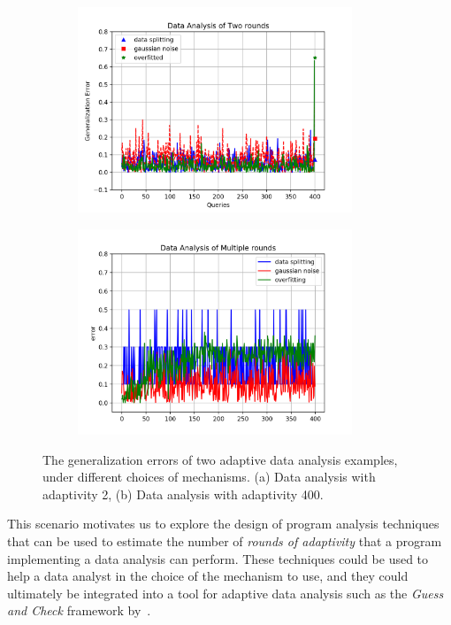 {\small
\begin{figure}
\centering
\begin{subfigure}{.48\textwidth}
\begin{centering}
\includegraphics[width=0.9\textwidth]{figures/tworound.png}
\caption{}
\end{centering}
\end{subfigure}
\quad
\begin{subfigure}{.48\textwidth}
\begin{centering}
\includegraphics[width=0.9\textwidth]{figures/multipleround.png}
\caption{}
\end{centering}
\end{subfigure}
\vspace{-0.4cm}
 \caption{
 The generalization errors of two adaptive data analysis examples, under different choices of mechanisms.
 (a) Data analysis with adaptivity 2, 
 (b) Data analysis with adaptivity 400. 
}
\label{fig:generalization_errors}
\vspace{-0.5cm}
\end{figure}
}
This scenario motivates us to explore the design of program analysis techniques that can be used to estimate the number of \emph{rounds of adaptivity} that a program implementing a data analysis can perform. These techniques could be used to help a data analyst in the choice of the mechanism to use,
and they
could ultimately be integrated into a tool for adaptive data analysis such as the \emph{Guess and Check} framework by~\cite{RogersRSSTW20}. 
%